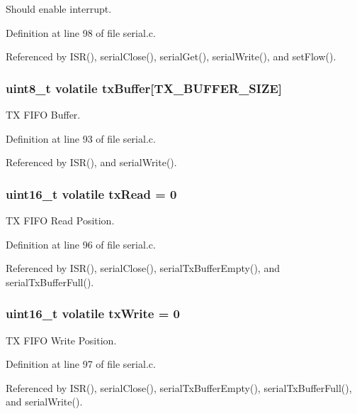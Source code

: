 Should enable interrupt. 



Definition at line 98 of file serial.\-c.



Referenced by I\-S\-R(), serial\-Close(), serial\-Get(), serial\-Write(), and set\-Flow().

\hypertarget{group__uart_gaca401a5697a6121045ed2ea5dd80001e}{
\subsubsection[{tx\-Buffer}]{\setlength{\rightskip}{0pt plus 5cm}uint8\-\_\-t volatile tx\-Buffer\mbox{[}{\bf T\-X\-\_\-\-B\-U\-F\-F\-E\-R\-\_\-\-S\-I\-Z\-E}\mbox{]}}}\label{group__uart_gaca401a5697a6121045ed2ea5dd80001e}


T\-X F\-I\-F\-O Buffer. 



Definition at line 93 of file serial.\-c.



Referenced by I\-S\-R(), and serial\-Write().

\hypertarget{group__uart_gaa7d4cb17a7fc5817722bdd106b31f60b}{
\subsubsection[{tx\-Read}]{\setlength{\rightskip}{0pt plus 5cm}uint16\-\_\-t volatile tx\-Read = 0}}\label{group__uart_gaa7d4cb17a7fc5817722bdd106b31f60b}


T\-X F\-I\-F\-O Read Position. 



Definition at line 96 of file serial.\-c.



Referenced by I\-S\-R(), serial\-Close(), serial\-Tx\-Buffer\-Empty(), and serial\-Tx\-Buffer\-Full().

\hypertarget{group__uart_gaa0a6ae00e44b68a3250aec0f9599c262}{
\subsubsection[{tx\-Write}]{\setlength{\rightskip}{0pt plus 5cm}uint16\-\_\-t volatile tx\-Write = 0}}\label{group__uart_gaa0a6ae00e44b68a3250aec0f9599c262}


T\-X F\-I\-F\-O Write Position. 



Definition at line 97 of file serial.\-c.



Referenced by I\-S\-R(), serial\-Close(), serial\-Tx\-Buffer\-Empty(), serial\-Tx\-Buffer\-Full(), and serial\-Write().


